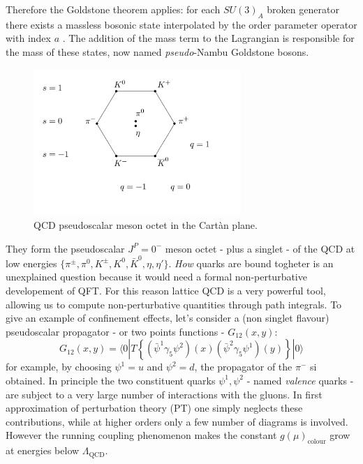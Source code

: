 \documentclass[english, LaM, oneside, noexaminfo]{sapthesis}
\newcommand{\la}{\langle}
\newcommand{\ra}{\rangle}
\begin{document}
Therefore the Goldstone theorem applies: for each $SU(3)_A$ broken generator there exists a massless bosonic state interpolated by the order parameter operator with index $a$ \cite{Goldstone-Theorem}.
The addition of the mass term to the Lagrangian is responsible for the mass of these states, now named {\it pseudo}-Nambu Goldstone bosons.
\begin{figure}[!h]
    \centering
    \includegraphics[width=0.7\textwidth]{imgs-MSc-thesis/ottuplice_via.pdf}
    \caption{QCD pseudoscalar meson octet in the Cartàn plane.}
    \label{fig:meson_octet}
\end{figure}
\newline
They form the pseudoscalar $J^P = 0^-$ meson octet - plus a singlet - of the QCD at low energies $\{ \pi^\pm,\pi^0,K^\pm,K^0,\bar K^0,\eta,\eta' \}$.
\textit{How} quarks are bound togheter is an unexplained question because it would need a formal non-perturbative developement of QFT.
For this reason lattice QCD is a very powerful tool, allowing us to compute non-perturbative quantities through path integrals.
\newline
To give an example of confinement effects, let's consider a (non singlet flavour) pseudoscalar propagator - or two points functions - $G_{12}(x,y)$:
\begin{equation*}
    G_{12}(x,y) = \la 0 | T \left\{ ( \bar\psi^1 \gamma_5 \psi^2 )(x) ( \bar\psi^2 \gamma_5 \psi^1 )(y) \right\} | 0 \ra
\end{equation*}
for example, by choosing $\psi^1 = u$ and $\psi^2 = d$, the propagator of the $\pi^-$ si obtained.
In principle the two constituent quarks $\psi^1, \psi^2$ - named \textit{valence} quarks - are subject to a very large number of interactions with the gluons.
In first approximation of perturbation theory (PT) one simply neglects these contributions, while at higher orders only a few number of diagrams is involved.
However the running coupling phenomenon makes the constant $g(\mu)_\text{colour}$ grow at energies below $\Lambda_\text{QCD}$. 
\end{document}
